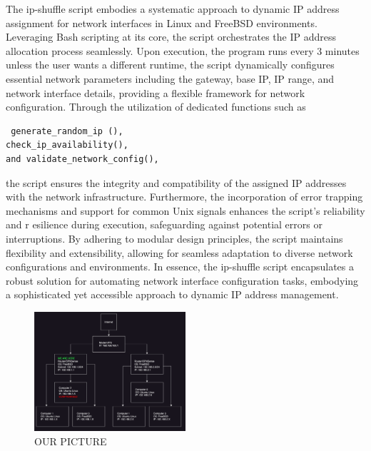 
The ip-shuffle script embodies a systematic approach to dynamic IP address 
assignment for network interfaces in Linux and FreeBSD environments. Leveraging
Bash scripting at its core, the script orchestrates the IP address allocation 
process seamlessly. Upon execution, the program runs every 3 minutes unless the 
user wants a different runtime, the script dynamically configures essential
network parameters including the gateway, base IP, IP range, and network 
interface details, providing a flexible framework for network configuration. 
Through the utilization of dedicated functions such as
\begin{verbatim}
 generate_random_ip (), 
check_ip_availability(), 
and validate_network_config(), 
\end{verbatim}
the script ensures the
integrity and compatibility of the assigned IP addresses with the network 
infrastructure. Furthermore, the incorporation of error trapping mechanisms 
and support for common Unix signals enhances the script's reliability and r
esilience during execution, safeguarding against potential errors or 
interruptions. By adhering to modular design principles, the script maintains
flexibility and extensibility, allowing for seamless adaptation to diverse 
network configurations and environments. In essence, the ip-shuffle script 
encapsulates a robust solution for automating network interface configuration 
tasks, embodying a sophisticated yet accessible approach to dynamic IP address 
management.

\label{sec:figs}


\begin{figure}
 \caption{OUR PICTURE}
  \centering
   \includegraphics[width=0.5\textwidth]{diagram.jpeg}
\end{figure}






